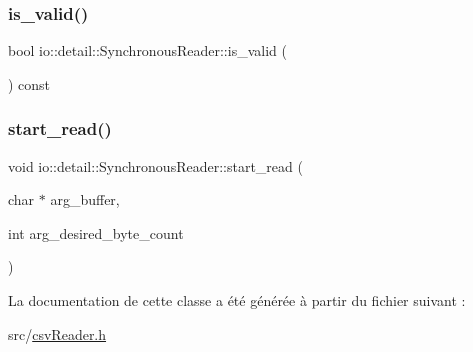 \subsubsection{\texorpdfstring{is\+\_\+valid()}{is\_valid()}}
{\footnotesize\ttfamily bool io\+::detail\+::\+Synchronous\+Reader\+::is\+\_\+valid (\begin{DoxyParamCaption}{ }\end{DoxyParamCaption}) const\hspace{0.3cm}{\ttfamily [inline]}}

\mbox{\label{classio_1_1detail_1_1SynchronousReader_a6cad1371b97e14f660914898b16433c4}} 
\subsubsection{\texorpdfstring{start\+\_\+read()}{start\_read()}}
{\footnotesize\ttfamily void io\+::detail\+::\+Synchronous\+Reader\+::start\+\_\+read (\begin{DoxyParamCaption}\item[{char $\ast$}]{arg\+\_\+buffer,  }\item[{int}]{arg\+\_\+desired\+\_\+byte\+\_\+count }\end{DoxyParamCaption})\hspace{0.3cm}{\ttfamily [inline]}}



La documentation de cette classe a été générée à partir du fichier suivant \+:\begin{DoxyCompactItemize}
\item 
src/\hyperlink{csvReader_8h}{csv\+Reader.\+h}\end{DoxyCompactItemize}
